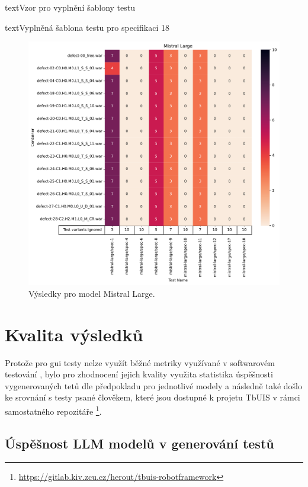 \documentclass[czech, ma, kiv, he, iso690numb, pdf, viewonly]{fasthesis}
\begin{document}
\begin{code}{text}{Vzor pro vyplnění šablony testu \label{lst:template}}
{\begin{code}{text}{Vyplněná šablona testu pro specifikaci 18 \label{lst:spec18}}
{        \begin{figure}[H]
            \includegraphics[width=\textwidth]{pic/mistral-large-results.pdf}
            \caption{Výsledky pro model Mistral Large.}
            \label{fig:res:mistral-large}
        \end{figure}

    \section{Kvalita výsledků} \label{sec:quality_eval}

    Protože pro \Acrshort{gui} testy nelze využít běžné metriky využívané v softwarovém testování \cite{COPPOLA2022107062}, bylo pro zhodnocení jejich kvality využita statistika úspěšnosti vygenerovaných tetů dle předpokladu pro jednotlivé modely a následně také došlo ke srovnání s testy psané člověkem, které jsou dostupné k projetu TbUIS v rámci samostatného repozitáře \footnote{\url{https://gitlab.kiv.zcu.cz/herout/tbuis-robotframework}}.

        \subsection{Úspěšnost LLM modelů v generování testů}

}
\end{code}}
\end{code}
\end{document}
